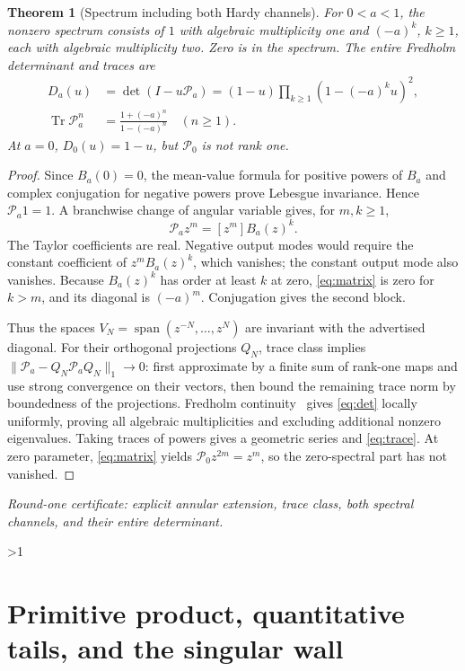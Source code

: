 \documentclass[10pt]{article}
\newtheorem{theorem}{Theorem}
\newcommand{\PP}{\mathcal P}
\newcommand{\Tr}{\operatorname{Tr}}
\begin{document}
\begin{theorem}[Spectrum including both Hardy channels]\label{thm:spectrum}
For $0<a<1$, the nonzero spectrum consists of $1$ with algebraic
multiplicity one and $(-a)^k$, $k\geq1$, each with algebraic multiplicity
two. Zero is in the spectrum. The entire Fredholm determinant and traces are
\begin{align}
 D_a(u)&=\det(I-u\PP_a)=(1-u)\prod_{k\geq1}(1-(-a)^ku)^2,
 \label{eq:det}\\
 \Tr\PP_a^n&=\frac{1+(-a)^n}{1-(-a)^n}\quad(n\geq1). \label{eq:trace}
\end{align}
At $a=0$, $D_0(u)=1-u$, but $\PP_0$ is not rank one.
\end{theorem}
\begin{proof}
Since $B_a(0)=0$, the mean-value formula for positive powers of $B_a$
and complex conjugation for negative powers prove Lebesgue invariance.
Hence $\PP_a1=1$. A branchwise change of angular variable gives, for
$m,k\geq1$,
\begin{equation}
 [z^k]\PP_a z^m=[z^m]B_a(z)^k. \label{eq:matrix}
\end{equation}
The Taylor coefficients are real. Negative output modes would require the
constant coefficient of $z^mB_a(z)^k$, which vanishes; the constant output
mode also vanishes. Because $B_a(z)^k$ has order at least $k$ at zero,
\eqref{eq:matrix} is zero for $k>m$, and its diagonal is $(-a)^m$.
Conjugation gives the second block.

Thus the spaces $V_N=\operatorname{span}(z^{-N},\ldots,z^N)$ are
invariant with the advertised diagonal. For their orthogonal projections
$Q_N$, trace class implies
$\|\PP_a-Q_N\PP_aQ_N\|_1\to0$: first approximate by a finite sum of
rank-one maps and use strong convergence on their vectors, then bound the
remaining trace norm by boundedness of the projections. Fredholm
continuity~\cite{Simon} gives \eqref{eq:det} locally uniformly, proving
all algebraic multiplicities and excluding additional nonzero eigenvalues.
Taking traces of powers gives a geometric series and \eqref{eq:trace}.
At zero parameter, \eqref{eq:matrix} yields
$\PP_0z^{2m}=z^m$, so the zero-spectral part has not vanished.
\end{proof}
\par\noindent\emph{Round-one certificate: explicit annular extension,
trace class, both spectral channels, and their entire determinant.}
\fi

\ifnum\CRevisionRound>1
\section{Primitive product, quantitative tails, and the singular wall}
\end{document}
